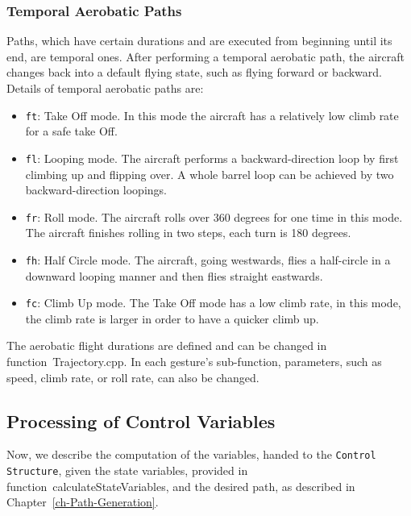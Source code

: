 \documentclass[11pt,a4paper]{scrartcl}		%
\begin{document}
\subsubsection*{Temporal Aerobatic Paths}

Paths, which have certain durations and are executed from beginning until its end, are  temporal ones. After performing a temporal aerobatic path, the aircraft changes back into a default flying state, such as flying forward or backward. 
Details of temporal aerobatic paths are:

\begin{itemize}

\item
\texttt{ft}: Take Off mode. In this mode the aircraft has a relatively low climb rate for a safe take Off.

\item
\texttt{fl}: Looping mode. The aircraft performs a backward-direction loop by first climbing up and flipping over. A whole barrel loop can be achieved by two backward-direction loopings. 

\item
\texttt{fr}: Roll mode. The aircraft rolls over 360 degrees for one time in this mode. The aircraft finishes rolling in two steps, each turn is 180 degrees.

\item
\texttt{fh}: Half Circle mode. The aircraft, going westwards, flies a half-circle in a downward looping manner and then flies straight eastwards.

\item
\texttt{fc}: Climb Up mode. The Take Off mode has a low climb rate, in this mode, the climb rate is larger in order to have a quicker climb up.

\end{itemize}

The aerobatic flight durations are defined and can be changed in function~\textsf{Trajectory.cpp}. In each gesture's sub-function, parameters, such as speed, climb rate, or roll rate, can also be changed.

\medskip





\subsection{Processing of Control Variables} \label{ch-control-variables}

Now, we describe the computation of the variables, handed to the \texttt{Control Structure}, given the state variables, provided in function~\textsf{calculateStateVariables}, and the desired path, as described in Chapter~\ref{ch-Path-Generation}.
\end{document}
